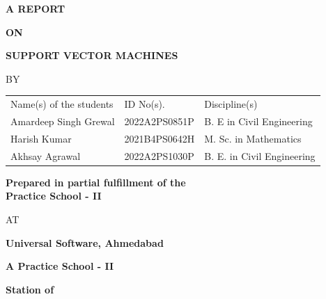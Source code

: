 \documentclass{book}
\begin{document}


\large

\thispagestyle{empty}
\centerline{\bf A REPORT}
\vspace*{0.3cm}
\centerline{\bf ON}
\vspace*{0.3cm}
\centerline{\bf SUPPORT VECTOR MACHINES} %
\vspace*{2cm}

\centerline{BY}
\vspace*{1cm}

\begin{center}
	\begin{tabular}{lll} %
		Name(s) of the students & \hspace*{2cm} ID No(s). & \hspace*{2cm} Discipline(s) \\ 
		Amardeep Singh Grewal &\hspace*{2cm} 2022A2PS0851P &\hspace*{2cm} B. E in Civil Engineering \\
		Harish Kumar &\hspace*{2cm} 2021B4PS0642H &\hspace*{2cm} M. Sc. in Mathematics \\
		Akhsay Agrawal & \hspace*{2cm} 2022A2PS1030P & \hspace*{2cm} B. E. in Civil Engineering\\
	\end{tabular}
\end{center}

\vspace*{2cm}
\begin{center}
	{\bf Prepared in partial fulfillment of the \\
	Practice School - II} \\ %
\end{center}

\vspace*{0.5cm}

\centerline{AT}

\vspace*{1cm}
        \centerline{\bf Universal Software, Ahmedabad} %
	\vspace{0.2cm}
	\centerline{\bf A Practice School - II}
	\vspace{0.2cm}
	\centerline{\bf Station of}
	\vspace{0.5cm}
\begin{figure}[ht]
\epsfxsize=1.0in
\centerline{}
\end{figure}
\end{document}
